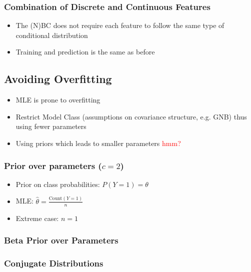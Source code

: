 \documentclass[10pt,a4paper]{scrartcl}
\begin{document}
\begin{multicols*}{2}
\subsubsection{Combination of Discrete and Continuous Features}

\begin{itemize}
\item The (N)BC does not require each feature to follow the same type of conditional distribution
\item Training and prediction is the same as before
\end{itemize}

\subsection{Avoiding Overfitting}

\begin{itemize}
\item MLE is prone to overfitting
\item Restrict Model Class (assumptions on covariance structure, e.g. GNB) thus using fewer parameters
\item Using priors which leads to smaller parameters \textcolor{red}{hmm?}
\end{itemize}

\subsubsection{Prior over parameters ($c=2$)}

\begin{itemize}
\item Prior on class probabilities: $P(Y=1)=\theta$
\item MLE: $\hat{\theta}=\frac{\text{Count}(Y=1)}{n}$
\item Extreme case: $n=1$
\end{itemize}

\subsubsection{Beta Prior over Parameters}



\subsubsection{Conjugate Distributions}


\end{multicols*}
\end{document}
